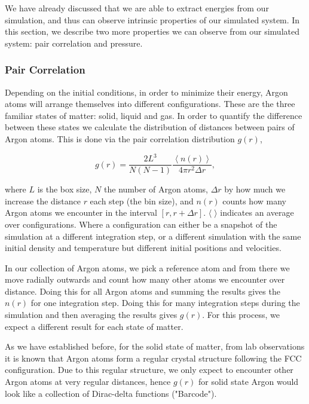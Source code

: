 \documentclass{IAYCPro}
\begin{document}
We have already discussed that we are able to extract energies from our simulation, and thus can observe intrinsic properties of our simulated system. In this section, we describe two more properties we can observe from our simulated system: pair correlation and pressure.

\subsubsection{Pair Correlation}
\label{sec: Pair Correlation}

Depending on the initial conditions, in order to minimize their energy, Argon atoms will arrange themselves into different configurations. These are the three familiar states of matter: solid, liquid and gas. In order to quantify the difference between these  states we calculate the distribution of distances between pairs of Argon atoms. This is done via the pair correlation distribution $g(r)$,

\begin{equation}
    g(r) = \frac{2L^3}{N(N-1)}\frac{\left\langle n(r)\right\rangle}{4\pi r^2 \Delta r},
    \label{eqn: Pair Correlation}
\end{equation}

\raggedbottom
\newpage

where $L$ is the box size, $N$ the number of Argon atoms, $\Delta r$ by how much we increase the distance $r$ each step (the bin size), and $n(r)$ counts how many Argon atoms we encounter in the interval $\left[r, r+\Delta r \right]$. $\langle \;\rangle$ indicates an average over configurations. Where a configuration can either be a snapshot of the simulation at a different integration step, or a different simulation with the same initial density and temperature but different initial positions and velocities.

In our collection of Argon atoms, we pick a reference atom and from there we move radially outwards and count how many other atoms we encounter over distance. Doing this for all Argon atoms and summing the results gives the $n(r)$ for one integration step. Doing this for many integration steps during the simulation and then averaging the results gives $g(r)$. For this process, we expect a different result for each state of matter. 

As we have established before, for the solid state of matter, from lab observations it is known that Argon atoms form a regular crystal structure following the FCC configuration. Due to this regular structure, we only expect to encounter other Argon atoms at very regular distances, hence $g(r)$ for solid state Argon would look like a collection of Dirac-delta functions ("Barcode"). 
\end{document}
